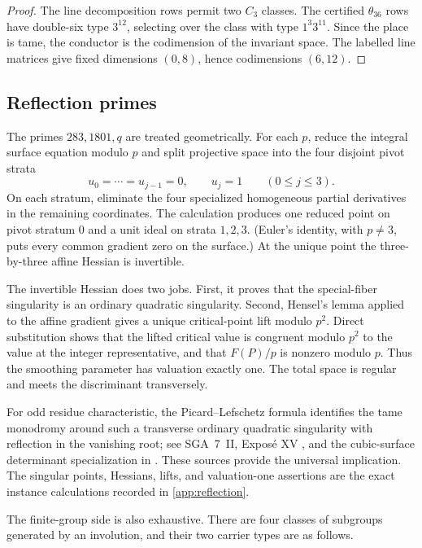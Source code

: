 \begin{proof}
The line decomposition rows permit two $C_3$ classes.  The certified
$\theta_{36}$ rows have double-six type $3^{12}$, selecting  over
the class with type $1^3 3^{11}$.  Since the place is tame, the conductor is
the codimension of the invariant space.  The labelled line matrices give
fixed dimensions $(0,8)$, hence codimensions $(6,12)$.
\end{proof}

\subsection{Reflection primes}
\label{sec:reflection}

The primes $283,1801,q$ are treated geometrically.  For each $p$, reduce the
integral surface equation modulo $p$ and split projective space into the four
disjoint pivot strata
\[
 u_0=\cdots=u_{j-1}=0,\qquad u_j=1\qquad(0\leq j\leq3).
\]
On each stratum, eliminate the four specialized homogeneous partial
derivatives in the remaining coordinates.  The calculation produces one
reduced point on pivot stratum $0$ and a unit ideal on strata $1,2,3$.
(Euler's identity, with $p\ne3$, puts every common gradient zero on the
surface.)  At the unique point the three-by-three affine Hessian is
invertible.

The invertible Hessian does two jobs.  First, it proves that the special-fiber
singularity is an ordinary quadratic singularity.  Second, Hensel's lemma
applied to the affine gradient gives a unique critical-point lift modulo
$p^2$.  Direct substitution shows that the lifted critical value is
congruent modulo $p^2$ to the value at the integer representative, and that
$F(P)/p$ is nonzero modulo $p$.  Thus the smoothing parameter has valuation
exactly one.  The total space is regular and meets the discriminant
transversely.

For odd residue characteristic, the Picard--Lefschetz formula identifies the
tame monodromy around such a transverse ordinary quadratic singularity with
reflection in the vanishing root; see SGA~7~II, Exposé XV
\citep{sga7ii1973}, and the cubic-surface determinant specialization in
\citet[Proposition 2.3, p.~858; Theorem 3.5, pp.~864--866;
cubic-surface specialization, p.~870]
{saito2012discriminant}.  These sources provide the universal implication.
The singular points, Hessians, lifts, and valuation-one assertions are the
exact instance calculations recorded in \cref{app:reflection}.

The finite-group side is also exhaustive.  There are four classes of
subgroups generated by an involution, and their two carrier types are as
follows.

